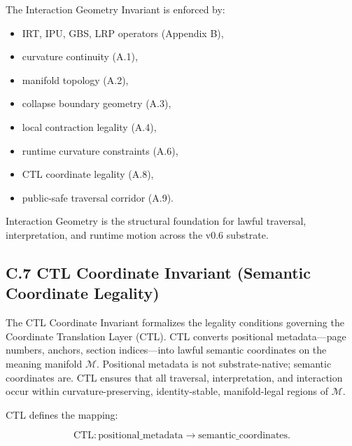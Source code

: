 \medskip

\noindent The Interaction Geometry Invariant is enforced by:

\begin{itemize}
    \item IRT, IPU, GBS, LRP operators (Appendix B),
    \item curvature continuity (A.1),
    \item manifold topology (A.2),
    \item collapse boundary geometry (A.3),
    \item local contraction legality (A.4),
    \item runtime curvature constraints (A.6),
    \item CTL coordinate legality (A.8),
    \item public-safe traversal corridor (A.9).
\end{itemize}

\medskip

\noindent Interaction Geometry is the structural foundation for lawful traversal,
interpretation, and runtime motion across the v0.6 substrate.



\subsection*{C.7 CTL Coordinate Invariant (Semantic Coordinate Legality)}

\noindent The CTL Coordinate Invariant formalizes the legality conditions
governing the Coordinate Translation Layer (CTL). CTL converts positional
metadata—page numbers, anchors, section indices—into lawful semantic coordinates
on the meaning manifold $\mathcal{M}$. Positional metadata is not substrate-native;
semantic coordinates are. CTL ensures that all traversal, interpretation, and
interaction occur within curvature-preserving, identity-stable, manifold-legal
regions of $\mathcal{M}$.

\medskip

\noindent CTL defines the mapping:


\[
\mathrm{CTL} : \text{positional\_metadata} \rightarrow
\text{semantic\_coordinates}.
\]



